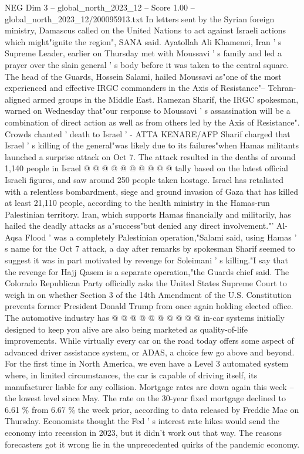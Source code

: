 \begin{textsample}{NEG Dim 3 – global\_north\_2023\_12 – Score 1.00 – global\_north\_2023\_12/200095913.txt}  \label{ex:f3_neg_200}
In letters sent by the Syrian foreign ministry, Damascus called on the United Nations to act against Israeli actions which might"ignite the region", SANA said.
Ayatollah Ali Khamenei, Iran ' s Supreme Leader, earlier on Thursday met with Moussavi ' s family and led a prayer over the slain general ' s body before it was taken to the central square.
The head of the Guards, Hossein Salami, hailed Moussavi as"one of the most experienced and effective IRGC commanders in the Axis of Resistance"-- Tehran-aligned armed groups in the Middle East.
Ramezan Sharif, the IRGC spokesman, warned on Wednesday that"our response to Moussavi ' s assassination will be a combination of direct action as well as from others led by the Axis of Resistance".
Crowds chanted ' death to Israel ' - ATTA KENARE/AFP Sharif charged that Israel ' s killing of the general"was likely due to its failures"when Hamas militants launched a surprise attack on Oct 7.
The attack resulted in the deaths of around 1,140 people in Israel @ @ @ @ @ @ @ @ @ @ tally based on the latest official Israeli figures, and saw around 250 people taken hostage.
Israel has retaliated with a relentless bombardment, siege and ground invasion of Gaza that has killed at least 21,110 people, according to the health ministry in the Hamas-run Palestinian territory.
Iran, which supports Hamas financially and militarily, has hailed the deadly attacks as a"success"but denied any direct involvement."' Al-Aqsa Flood ' was a completely Palestinian operation,"Salami said, using Hamas ' s name for the Oct 7 attack, a day after remarks by spokesman Sharif seemed to suggest it was in part motivated by revenge for Soleimani ' s killing."I say that the revenge for Hajj Qasem is a separate operation,"the Guards chief said.
The Colorado Republican Party officially asks the United States Supreme Court to weigh in on whether Section 3 of the 14th Amendment of the U.S.
Constitution prevents former President Donald Trump from once again holding elected office.
The automotive industry has @ @ @ @ @ @ @ @ @ @ in-car systems initially designed to keep you alive are also being marketed as quality-of-life improvements.
While virtually every car on the road today offers some aspect of advanced driver assistance system, or ADAS, a choice few go above and beyond.
For the first time in North America, we even have a Level 3 automated system where, in limited circumstances, the car is capable of driving itself, its manufacturer liable for any collision.
Mortgage rates are down again this week -- the lowest level since May.
The rate on the 30-year fixed mortgage declined to 6.61 \% from 6.67 \% the week prior, according to data released by Freddie Mac on Thursday.
Economists thought the Fed ' s interest rate hikes would send the economy into recession in 2023, but it didn't work out that way.
The reasons forecasters got it wrong lie in the unprecedented quirks of the pandemic economy.

\end{textsample}
